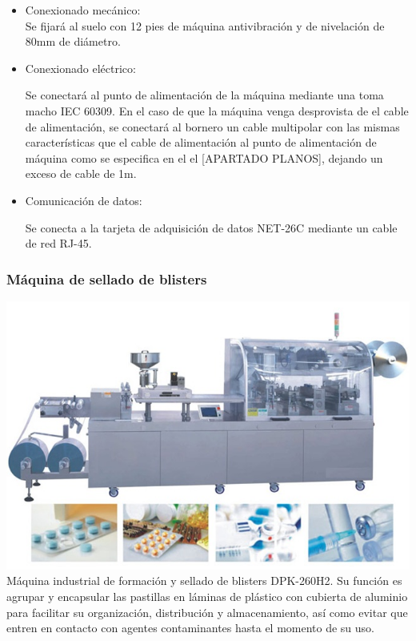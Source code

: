 		\begin{itemize}
				\item{Conexionado mecánico:}\\
				
				Se fijará al suelo con 12 pies de máquina antivibración y de nivelación de 80mm de diámetro.

				\item{Conexionado eléctrico:}

				Se conectará al punto de alimentación de la máquina mediante una  toma macho IEC 60309. En el caso de que la máquina venga desprovista de el cable de alimentación, se conectará al bornero un cable multipolar con las mismas características que el cable de alimentación al punto de alimentación de máquina como se especifica en el el [APARTADO PLANOS], dejando un exceso de cable de 1m. \
				
				\item{Comunicación de datos:}

				Se conecta a la tarjeta de adquisición de datos NET-26C mediante un cable de red RJ-45.
		\end{itemize}

    \newpage

	\subsubsection{Máquina de sellado de blisters }

	\includegraphics[scale=0.5]{Datasheets/5Foto.png}\\

	Máquina industrial de formación y sellado de blisters DPK-260H2. Su función es agrupar y encapsular las pastillas en láminas de plástico con cubierta de aluminio para facilitar su organización, distribución y almacenamiento, así como evitar que entren en contacto con agentes contaminantes hasta el momento de su uso.\\

